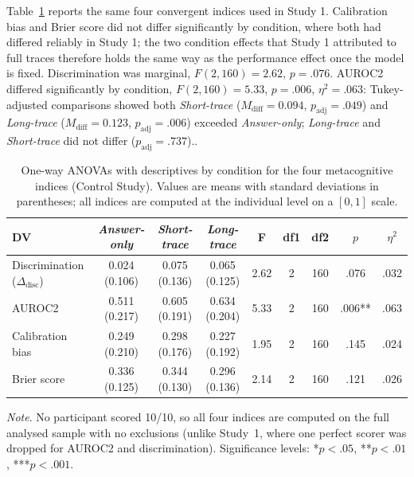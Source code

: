 \documentclass[manuscript,review,anonymous]{acmart}
\begin{document}
Table~\ref{tab:study2_meta} reports the same four convergent indices used in
Study 1. Calibration bias and Brier score did not differ significantly by
condition, where both had differed reliably in Study 1; the two condition
effects that Study 1 attributed to full traces therefore holds the same way as the
performance effect once the model is fixed. Discrimination was marginal,
$F(2, 160) = 2.62$, $p = .076$. AUROC2 differed significantly by condition,
$F(2, 160) = 5.33$, $p = .006$, $\eta^2 = .063$: Tukey-adjusted comparisons
showed both \textit{Short-trace} ($M_{\mathrm{diff}} = 0.094$,
$p_{\mathrm{adj}} = .049$) and \textit{Long-trace} ($M_{\mathrm{diff}} =
0.123$, $p_{\mathrm{adj}} = .006$) exceeded \textit{Answer-only};
\textit{Long-trace} and \textit{Short-trace} did not differ
($p_{\mathrm{adj}} = .737$)..

\begin{table}[!htp]
\centering
\caption{One-way ANOVAs with descriptives by condition for the four
metacognitive indices (Control Study). Values are means with standard deviations in
parentheses; all indices are computed at the individual level on a $[0,1]$
scale.}
\label{tab:study2_meta}
\begin{tabular}{lcccccccc}
\hline
DV & \textit{Answer-only} & \textit{Short-trace} & \textit{Long-trace} & F & df1 & df2 & $p$ & $\eta^2$ \\ \hline
Discrimination ($\Delta_{\mathrm{disc}}$) & 0.024 (0.106) & 0.075 (0.136) & 0.065 (0.125) & 2.62 & 2 & 160 & .076     & .032 \\
AUROC2                                    & 0.511 (0.217) & 0.605 (0.191) & 0.634 (0.204) & 5.33 & 2 & 160 & .006**   & .063 \\
Calibration bias                          & 0.249 (0.210) & 0.298 (0.176) & 0.227 (0.192) & 1.95 & 2 & 160 & .145     & .024 \\
Brier score                               & 0.336 (0.125) & 0.344 (0.130) & 0.296 (0.136) & 2.14 & 2 & 160 & .121     & .026 \\
\hline
\end{tabular}

\raggedright \small \textit{Note}. No participant scored 10/10, so all four
indices are computed on the full analysed sample with no exclusions (unlike
Study~1, where one perfect scorer was dropped for AUROC2 and discrimination).
Significance levels: *$p < .05$, **$p < .01$, ***$p < .001$.
\end{table}
\end{document}

